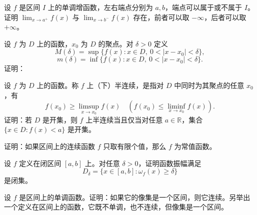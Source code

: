 \noindent\begin{minipage}{\textwidth}
设 $f$ 是区间 $I$ 上的单调增函数，左右端点分别为 $a,b$，端点可以属于或不属于 $I$。证明 $\lim_{x\to a^+}f(x)$ 与 $\lim_{x\to b^-}f(x)$ 存在，前者可以取 $-\infty$，后者可以取 $+\infty$。
\end{minipage}\par\vfill
\newpage
\noindent\begin{minipage}{\textwidth}
设 $f$ 为 $D$ 上的函数，$x_0$ 为 $D$ 的聚点。对 $\delta>0$ 定义\[M(\delta)=\sup\{f(x):x\in D,\ 0<|x-x_0|<\delta\},\]\[m(\delta)=\inf\{f(x):x\in D,\ 0<|x-x_0|<\delta\}.\]证明：
\end{minipage}\par\vfill
\newpage
\noindent\begin{minipage}{\textwidth}
设 $f$ 为 $D$ 上的函数。称 $f$ 上（下）半连续，是指对 $D$ 中同时为其聚点的任意 $x_0$，有\[f(x_0)\ge\limsup_{x\to x_0}f(x)\quad\left(f(x_0)\le\liminf_{x\to x_0}f(x)\right).\]证明：若 $D$ 是开集，则 $f$ 上半连续当且仅当对任意 $a\in\mathbb R$，集合 $\{x\in D:f(x)<a\}$ 是开集。
\end{minipage}\par\vfill
\noindent\begin{minipage}{\textwidth}
证明：如果区间上的连续函数 $f$ 只取有限个值，那么 $f$ 为常值函数。
\end{minipage}\par\vfill
\noindent\begin{minipage}{\textwidth}
设 $f$ 定义在闭区间 $[a,b]$ 上。对任意 $\delta>0$，证明函数振幅满足\[D_\delta=\{x\in[a,b]:\omega_f(x)\ge\delta\}\]是闭集。
\end{minipage}\par\vfill
\noindent\begin{minipage}{\textwidth}
设 $f$ 是区间上的单调函数。证明：如果它的像集是一个区间，则它连续。另举出一个定义在区间上的函数，它既不单调，也不连续，但像集是一个区间。
\end{minipage}\par\vfill

